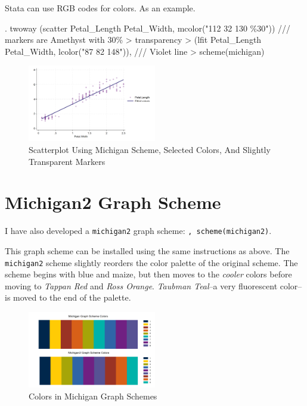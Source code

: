 \documentclass[
]{article}
\begin{document}
Stata can use RGB codes for colors. As an example.

\begin{stlog}
. twoway (scatter Petal_Length Petal_Width, mcolor("112 32 130 \%30")) /// markers are Amethyst with 30\%
>  transparency
> (lfit Petal_Length Petal_Width, lcolor("87 82 148")), /// Violet line
> scheme(michigan)
\end{stlog}



\begin{figure}
\centering
\includegraphics[width=0.5\textwidth,height=\textheight]{myscatter3.png}
\caption{Scatterplot Using Michigan Scheme, Selected Colors, And
Slightly Transparent Markers}
\end{figure}

\newpage

\section{Michigan2 Graph Scheme}\label{michigan2-graph-scheme}

I have also developed a \texttt{michigan2} graph scheme:
\texttt{,\ scheme(michigan2)}.

This graph scheme can be installed using the same instructions as above.
The \texttt{michigan2} scheme slightly reorders the color palette of the
original scheme. The scheme begins with blue and maize, but then moves
to the \emph{cooler} colors before moving to \emph{Tappan Red} and
\emph{Ross Orange}. \emph{Taubman Teal}--a very fluorescent color--is
moved to the end of the palette.



\begin{figure}
\centering
\includegraphics[width=0.5\textwidth,height=\textheight]{MichiganColorsStata3.png}
\caption{Colors in Michigan Graph Schemes}
\end{figure}
\end{document}
